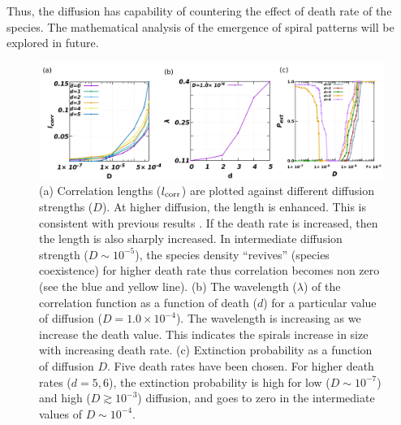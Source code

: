 \documentclass[aps, pre, twocolumn, amsmath, superscriptaddress,showkeys,showpacs]{revtex4-1}
\begin{document}
{Thus, the diffusion has capability of %
	{ countering}  the effect of death rate of the species. The mathematical analysis of the emergence of  spiral patterns  \cite{ipsen2000amplitude,ipsen2000amplitudee,gong2003antispiral,mondal2019diffusion,szczesny2014characterization,mondal2021spatiotemporal} will be explored in future. \\
\begin{figure}
	
	 \includegraphics[width=18 cm,height=5.6 cm]{Diagram4.png} 

	\caption{ %
		(a) Correlation lengths ($l_{\rm corr}$) are plotted against different diffusion strengths ($D$). {At  higher diffusion}, the length is enhanced. This is consistent with previous results \cite{reichenbach2007mobility}. If the death rate is increased, then the length is also sharply increased. In intermediate diffusion strength ($D\sim 10^{-5}$), the species density ``revives'' (species coexistence) for higher death rate thus correlation becomes non zero (see the blue and yellow line). 
	{  (b) %
		The wavelength ($\lambda$) of the correlation function as a function of death ($d$) for a particular value of diffusion ($D=1.0\times10^{-4}$). The wavelength is increasing as we increase the death value. This indicates the spirals increase in size with increasing death rate. } 
	(c)  Extinction probability as a function of diffusion $D$. Five  death rates have been chosen. For higher death rates ($d=5,6$), the extinction probability is high for low ($D\sim 10^{-7}$) and high ($D\gtrsim 10^{-3}$) diffusion, and goes to zero in the intermediate values of $D \sim 10^{-4}$.}
	\label{fig4-corr}
\end{figure}

}
\end{document}
